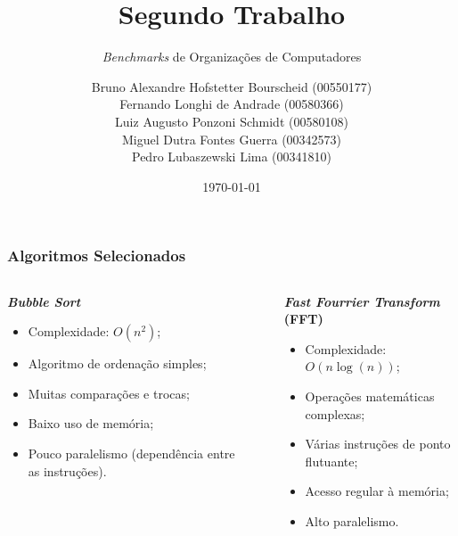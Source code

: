 \documentclass{beamer}
\title[Segundo Trabalho]{Segundo Trabalho}
\subtitle{\textit{Benchmarks} de Organizações de Computadores}
\author[Grupo 13]{Bruno Alexandre Hofstetter Bourscheid (00550177)
              \\ Fernando Longhi de Andrade (00580366)
              \\ Luiz Augusto Ponzoni Schmidt (00580108)
              \\ Miguel Dutra Fontes Guerra (00342573)
              \\ Pedro Lubaszewski Lima (00341810)}
\institute[]{INF01113\\Organização De Computadores B}
\date[\today]{\today}
\begin{document}
    \begin{frame}
        \maketitle
    \end{frame}

    \begin{frame}
        \frametitle{Algoritmos Selecionados}
        \begin{columns}
            \begin{column}{0.33\textwidth}

                \begin{center}
                    \textbf{\textit{Bubble Sort}}
                \end{center}

                \begin{itemize}
                    \footnotesize
                    \item Complexidade: $O(n^2)$;
                    \item Algoritmo de ordenação simples;
                    \item Muitas comparações e trocas;
                    \item Baixo uso de memória;
                    \item Pouco paralelismo (dependência entre as instruções).
                \end{itemize}

            \end{column}

            \begin{column}{0.01\textwidth}
                \rule{.1mm}{0.75\textheight}
            \end{column}

            \begin{column}{0.33\textwidth}

                \begin{center}
                    \textbf{\textit{Fast Fourrier Transform} (FFT)}
                \end{center}

                \begin{itemize}
                    \footnotesize
                    \item Complexidade: $O(n\log(n))$;
                    \item Operações matemáticas complexas;
                    \item Várias instruções de ponto flutuante;
                    \item Acesso regular à memória;
                    \item Alto paralelismo.
                \end{itemize}


\end{column}
\end{columns}
\end{frame}
\end{document}
